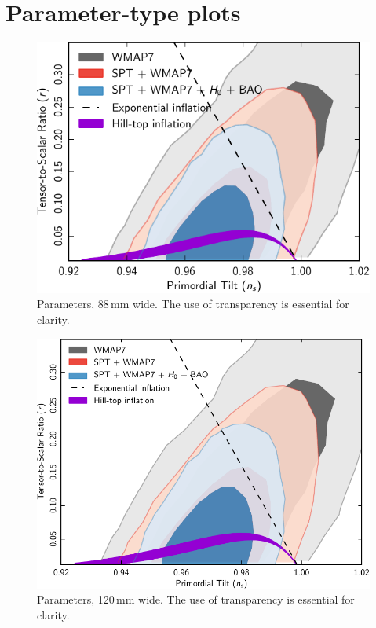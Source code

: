 \documentclass[traditabstract]{aa}
\begin{document}
\clearpage








\section{Parameter-type plots}


\begin{figure}[ht]
\includegraphics[width=\columnwidth]{PlanckFig_parameters_python_88mm}
\caption{Parameters, 88\,mm wide.  The use of transparency is essential for clarity.}
\label{fig:parameters_python88}
\end{figure}

\begin{figure}[H!b]
\sidecaption
\includegraphics[width=12cm]{PlanckFig_parameters_python_120mm}
\caption{Parameters, 120\,mm wide.  The use of transparency is essential for clarity.}
\label{fig:parameters_python120}
\end{figure}
\end{document}
